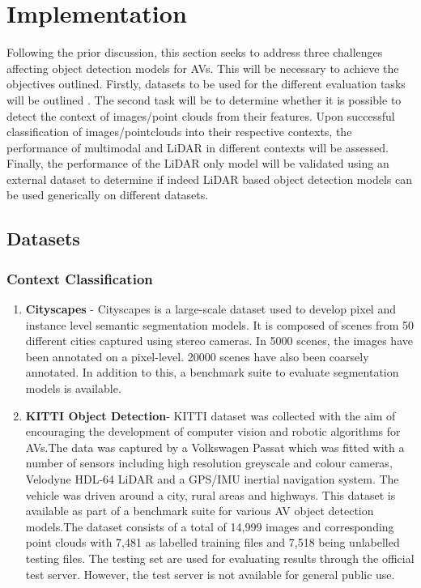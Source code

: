 \let\textcircled=\pgftextcircled


\chapter{Implementation}
\label{chap:implementation}
Following the prior discussion, this section seeks to address three challenges affecting object detection models for AVs. This will be necessary to achieve the objectives outlined. Firstly, datasets to be used for the different evaluation tasks will be outlined . The second task will be to determine whether it is possible to detect the context of  images/point clouds from their features. Upon successful classification of images/pointclouds into their respective contexts, the performance of multimodal and LiDAR in different contexts will be assessed.  Finally, the performance of the LiDAR only model will be validated using an external dataset to determine if indeed LiDAR based object detection models can be used generically on different datasets. 
\section{Datasets}
\subsection{Context Classification}
\begin{enumerate}
	\item \textbf{Cityscapes} - Cityscapes is a large-scale dataset used to develop pixel and instance level semantic segmentation models. It is composed of scenes from 50 different cities captured using stereo cameras. In 5000 scenes, the images have been annotated on a pixel-level. 20000 scenes have also been coarsely annotated. In addition to this, a benchmark suite to evaluate segmentation models is available.  
	
	\item \textbf{KITTI Object Detection}- KITTI dataset was collected with the aim of encouraging the development of computer vision and robotic algorithms for AVs.The data was captured by a Volkswagen Passat which was fitted with a number of sensors including high resolution greyscale and colour cameras, Velodyne HDL-64 LiDAR and a GPS/IMU inertial navigation system. The vehicle was driven around a city, rural areas and highways. This dataset is available as part of a benchmark suite for various AV object detection models.The dataset consists of  a total of 14,999 images and corresponding point clouds with  7,481 as labelled training files and 7,518 being unlabelled testing files. The testing set are used for evaluating results through the official test server. However, the test server is not available for general public use. 
\end{enumerate}

